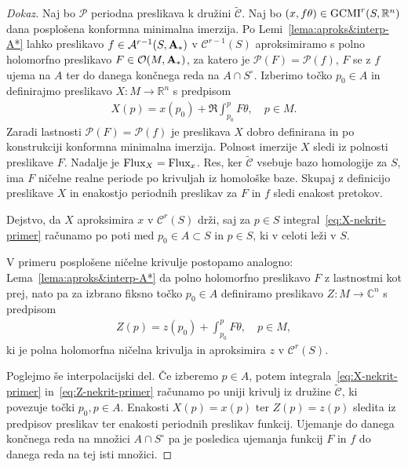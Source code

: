 \documentclass[12pt,a4paper,twoside]{article}
\theoremstyle{definition} %
\newenvironment{dokaz}[1][Dokaz]{\begin{proof}[#1]}{\end{proof}}
\theoremstyle{plain} %
\numberwithin{equation}{section}  %
\begin{document}
\begin{dokaz}
Naj bo $\mathcal{P}$ periodna preslikava k družini $\tilde{\mathcal{C}}$. 
Naj bo $(x, f\theta) \in \textup{GCMI}^{r}(S, \mathbb{R}^{n})$ dana posplošena konformna minimalna imerzija. Po Lemi~\ref{lema:aproks&interp-A*} lahko preslikavo $f \in \mathcal{A}^{r-1}(S, \textup{\textbf{A}}_{*})$ v $\mathcal{C}^{r-1}(S)$ aproksimiramo s polno holomorfno preslikavo $F \in \mathcal{O}(M, \textup{\textbf{A}}_{*})$, za katero je $\mathcal{P}(F) = \mathcal{P}(f)$, $F$ se z $f$ ujema na $A$ ter do danega končnega reda na $A \cap S^{\circ}$.
Izberimo točko $p_0 \in A$ in definirajmo preslikavo $X \colon M \to \mathbb{R}^{n}$ s predpisom
\begin{gather} \label{eq:X-nekrit-primer}
X(p) = x(p_0) + \Re \int_{p_0}^{p} F\theta, \quad p \in M.
\end{gather}
Zaradi lastnosti $\mathcal{P}(F) = \mathcal{P}(f)$ je preslikava $X$ dobro definirana in po konstrukciji konformna minimalna imerzija. 
Polnost imerzije $X$ sledi iz polnosti preslikave $F$.
Nadalje je $\textup{Flux}_{X} = \textup{Flux}_{x}$. Res, ker $\tilde{\mathcal{C}}$ vsebuje bazo homologije za $S$, ima $F$ ničelne realne periode po krivuljah iz homološke baze. Skupaj z definicijo preslikave $X$ in enakostjo periodnih preslikav za $F$ in $f$ sledi enakost pretokov.

Dejstvo, da $X$ aproksimira $x$ v $\mathcal{C}^{r}(S)$ drži, saj za $p \in S$ integral~\eqref{eq:X-nekrit-primer} računamo po poti med $p_0 \in A \subset S$ in $p \in S$, ki v celoti leži v $S$.

V primeru posplošene ničelne krivulje postopamo analogno: Lema~\ref{lema:aproks&interp-A*} da polno holomorfno preslikavo $F$ z lastnostmi kot prej, nato pa za izbrano fiksno točko $p_0 \in A$ definiramo preslikavo $Z \colon M \to \mathbb{C}^{n}$ s predpisom
\begin{gather} \label{eq:Z-nekrit-primer}
Z(p) = z(p_0) + \int_{p_0}^{p} F\theta, \quad p \in M,
\end{gather}
ki je polna holomorfna ničelna krivulja in aproksimira $z$ v $\mathcal{C}^{r}(S)$.

Poglejmo še interpolacijski del.
Če izberemo $p \in A$, potem integrala~\eqref{eq:X-nekrit-primer} in~\eqref{eq:Z-nekrit-primer} računamo po uniji krivulj iz družine $\tilde{\mathcal{C}}$, ki povezuje točki $p_0, p \in A$.
Enakosti $X(p) = x(p)$ ter $Z(p) = z(p)$ sledita iz predpisov preslikav ter enakosti periodnih preslikav funkcij.
Ujemanje do danega končnega reda na množici $A \cap S^{\circ}$ pa je posledica ujemanja funkcij $F$ in $f$ do danega reda na tej isti množici.
\end{dokaz}
\end{document}
